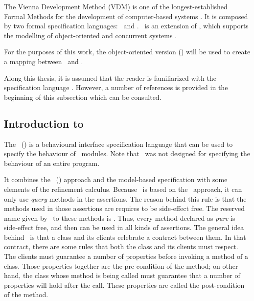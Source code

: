 The Vienna Development Method (VDM) \cite{Fitzgerald&05} \cite{Jones86g} \cite{Overture07} \cite{CskVdmHome} is one of the longest-established Formal Methods for the development of computer-based systems \cite{wikipedia}. It is composed by two formal specification languages: \vdm\ and \vpp. \vpp\ is an extension of \vdm, which supports the modelling of object-oriented and concurrent systems \cite{vpplangman}. 

For the purposes of this work, the object-oriented version (\vpp) will be used to create a mapping between \vpp\ and \jml. 

Along this thesis, it is assumed that the reader is familiarized with the specification language \vpp. However, a number of references is provided in the beginning of this subsection which can be consulted.


\subsection{Introduction to \jml}
\label{chap1:back:jml}
The \jmllong\ (\jml) \cite{Leavens-etal00} \cite{leavens-baker03} \cite{leavens-Baker-Ruby99b} \cite{leavens-etal07} \cite{poll-jacobs00} is a behavioural 
interface specification language that can be used to specify the behaviour of \java\ modules. Note that \jml\ was not designed 
for specifying the behaviour of an entire program.

It combines the \dbclong\ (\dbc) \cite{meyerdbc92} approach and the model-based specification with some elements 
of the refinement calculus. Because \jml\ is based on the \dbc\ approach, it can only use \textit{query} methods 
in the assertions. The reason behind this rule is that the methods used in those assertions are requires to be side-effect free. 
The reserved name given by \jml\ to these methods is . Thus, every method declared as \textit{pure} is side-effect free, and then can be used in all kinds of assertions.
The general idea behind \jml\ is that a class and its clients celebrate a contract between them. In that contract, there are some rules that both the class and its clients must respect.
The clients must guarantee a number of properties before invoking a method of a class. Those properties together are the 
pre-condition of the method; on other hand, the class whose method is being called must guarantee that a number of properties 
will hold after the call. These properties are called the post-condition of the method.

